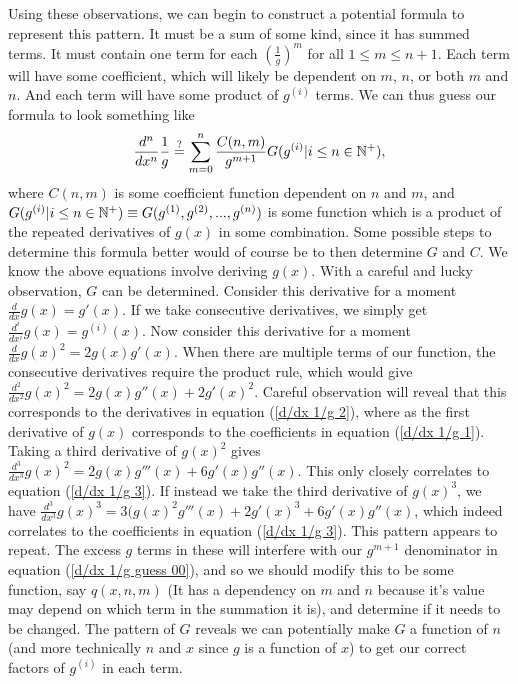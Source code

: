Using these observations, we can begin to construct a potential formula to represent this pattern. It must be a sum of some kind, since it has summed terms. It must contain one term for each $\left(\frac{1}{g}\right)^m$ for all $1\leq m \leq n+1$. Each term will have some coefficient, which will likely be dependent on $m$, $n$, or both $m$ and $n$. And each term will have some product of $g^{(i)}$ terms. We can thus guess our formula to look something like
\begin{align}
	\frac{d^n}{dx^n}\frac{1}{g} \overset{?}{=} \sum_{m=0}^{n}\frac{C(n,m)}{g^{m+1}}G( g^{(i)}|i \leq n \in {\mathbb N}^+), \label{d/dx 1/g guess 00}
\end{align}
where $C(n,m)$ is some coefficient function dependent on $n$ and $m$, and $G(g^{(i)}|i \leq n \in {\mathbb N}^+) \equiv G(g^{(1)}, g^{(2)},...,g^{(n)})$ is some function which is a product of the repeated derivatives of $g(x)$ in some combination. Some possible steps to determine this formula better would of course be to then determine $G$ and $C$. We know the above equations involve deriving $g(x)$. With a careful and lucky observation, $G$ can be determined. Consider this derivative for a moment $\frac{d}{dx} g(x) =  g'(x)$. If we take consecutive derivatives, we simply get $\frac{d^i}{dx^i} g(x) =  g^{(i)}(x)$. Now consider this derivative for a moment $\frac{d}{dx} g(x)^2 =  2g(x)g'(x)$. When there are multiple terms of our function, the consecutive derivatives require the product rule, which would give $\frac{d^2}{dx^2} g(x)^2 =  2g(x)g''(x)+2g'(x)^2$. Careful observation will reveal that this corresponds to the derivatives in equation (\ref{d/dx 1/g 2}), where as the first derivative of $g(x)$ corresponds to the coefficients in equation (\ref{d/dx 1/g 1}). Taking a third derivative of $g(x)^2$ gives $\frac{d^3}{dx^3} g(x)^2 =  2g(x)g'''(x)+6g'(x)g''(x)$. This only closely correlates to equation (\ref{d/dx 1/g 3}). If instead we take the third derivative of $g(x)^3$, we have $\frac{d^3}{dx^3} g(x)^3 =  3(g(x)^2g'''(x)+2g'(x)^3 +6g'(x)g''(x)$, which indeed correlates to the coefficients in equation (\ref{d/dx 1/g 3}). This pattern appears to repeat. The excess $g$ terms in these will interfere with our $g^{m+1}$ denominator in equation (\ref{d/dx 1/g guess 00}), and so we should modify this to be some function, say $q(x, n, m)$ (It has a dependency on $m$ and $n$ because it's value may depend on which term in the summation it is), and determine if it needs to be changed. The pattern of $G$ reveals we can potentially make $G$ a function of $n$ (and more technically $n$ and $x$ since $g$ is a function of $x$) to get our correct factors of $g^{(i)}$ in each term.
